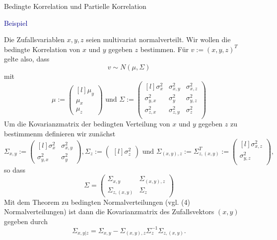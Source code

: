 \documentclass[
  8pt,
  ignorenonframetext,
]{beamer}
\begin{document}
\begin{frame}{Bedingte Korrelation und Partielle Korrelation}
\protect\hypertarget{bedingte-korrelation-und-partielle-korrelation-3}{}
\vspace{1mm}
\small

\textcolor{darkblue}{Beispiel} \footnotesize

Die Zufallsvariablen \(x,y,z\) seien multivariat normalverteilt. Wir
wollen die bedingte Korrelation von \(x\) und \(y\) gegeben \(z\)
bestimmen. Für \(v := (x,y,z)^T\) gelte also, dass \begin{equation}
v\sim N(\mu,\Sigma)
\end{equation} mit \begin{equation}
\mu
:=
\begin{pmatrix*}[l]
\mu_y     \\
\mu_{x} \\
\mu_{z}
\end{pmatrix*}
\mbox{ und }
\Sigma :=
\begin{pmatrix*}[l]
\sigma^2_{x}   & \sigma^2_{x,y} & \sigma^{2}_{x,z} \\
\sigma^2_{y,x} & \sigma^2_{y}   & \sigma^{2}_{y,z} \\
\sigma^2_{z,x} & \sigma^2_{z,y} & \sigma^{2}_{z}     \\
\end{pmatrix*}
\end{equation} Um die Kovarianzmatrix der bedingten Verteilung von \(x\)
und \(y\) gegeben \(z\) zu bestimmenm definieren wir zunächst
\begin{equation}
\Sigma_{x,y}
:=
\begin{pmatrix*}[l]
\sigma^2_{x}   & \sigma^2_{x,y} \\
\sigma^2_{y,x} & \sigma^2_{y}
\end{pmatrix*},
\Sigma_{z}
:=
\begin{pmatrix*}[l]
\sigma^{2}_{z}
\end{pmatrix*}
\mbox{ und }
\Sigma_{(x,y),z} := \Sigma_{z, (x,y)}^T :=
\begin{pmatrix*}[l]
\sigma^{2}_{x,z} \\
\sigma^{2}_{y,z} \\
\end{pmatrix*},
\end{equation} so dass \begin{equation}
\Sigma =
\begin{pmatrix}
\Sigma_{x,y}      & \Sigma_{(x,y),z} \\
\Sigma_{z, (x,y)} & \Sigma_{z}
\end{pmatrix}
\end{equation} Mit dem Theorem zu bedingten Normalverteilungen (vgl. (4)
Normalverteilungen) ist dann die Kovarianzmatrix des Zufallsvektors
\((x,y)\) gegeben durch \begin{equation}
\Sigma_{x,y|z}
= \Sigma_{x,y} - \Sigma_{(x,y),z}\Sigma_{z}^{-1}\Sigma_{z,(x,y)}.
\end{equation}
\end{frame}
\end{document}
